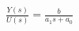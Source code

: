 \documentclass[preview]{standalone}
\begin{document}
\begin{align*}
\frac{Y(s)}{U(s)} = \frac{b}{a_1 s + a_0}
\end{align*}
\end{document}
